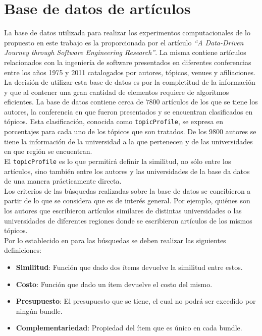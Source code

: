 \section{Base de datos de artículos}
La base de datos utilizada para realizar los experimentos computacionales de lo propuesto en este trabajo es la proporcionada por el artículo \textit{\textquotedblleft A Data-Driven Journey through Software Engineering Research\textquotedblright}\cite{dataDrive}. La misma contiene artículos relacionados con la ingeniería de software presentados en diferentes conferencias entre los años 1975 y 2011 catalogados por autores, tópicos, venues y afiliaciones. La decisión de utilizar esta base de datos es por la completitud de la información y que al contener una gran cantidad de elementos requiere de algoritmos eficientes. La base de datos contiene cerca de $7800$ artículos de los que se tiene los autores, la conferencia en que fueron presentados y se encuentran clasificados en tópicos. Esta clasificación, conocida como \texttt{topicProfile}, se expresa en porcentajes para cada uno de los tópicos que son tratados. De los $9800$ autores se tiene la información de la universidad a la que pertenecen y de las universidades en que región se encuentran.\\
El \texttt{topicProfile} es lo que permitirá definir la similitud, no sólo entre los artículos, sino también entre los autores y las universidades de la base da datos de una manera prácticamente directa.\\

Los criterios de las búsquedas realizadas sobre la base de datos se concibieron a partir de lo que se considera que es de interés general. Por ejemplo, quiénes son los autores que escribieron artículos similares de distintas universidades o las universidades de diferentes regiones donde se escribieron artículos de los mismos tópicos.\\
Por lo establecido en \cite{compositeRetrival} para las búsquedas se deben realizar las siguientes definiciones:
\begin{itemize}
  \item \textbf{Similitud}: Función que dado dos ítems devuelve la similitud entre estos.
  \item \textbf{Costo}: Función que dado un ítem devuelve el costo del mismo.
  \item \textbf{Presupuesto}: El presupuesto que se tiene, el cual no podrá ser excedido por ningún bundle.
  \item \textbf{Complementariedad}: Propiedad del ítem que es único en cada bundle.
\end{itemize}

